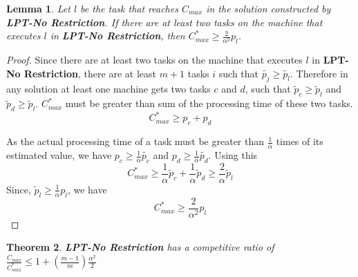 \documentclass[10pt, conference, compsocconf]{IEEEtran}
\newtheorem{theorem}{Theorem}
\newtheorem{lemma}[theorem]{Lemma}
\begin{document}
\begin{lemma}\label{No Restriction}
  Let $l$ be the task that reaches $C_{max}$ in the solution
  constructed by \textbf{LPT-No Restriction}. If there are at least two
  tasks on the machine that executes $l$ in \textbf{LPT-No Restriction}, then 
  $C_{max}^* \geq {\frac{2}{\alpha^{2}}} p_l$.
\end{lemma}
\begin{proof}
  Since there are at least two tasks on the machine that executes $l$
  in \textbf{LPT-No Restriction}, there are at least $m+1$ tasks $i$
  such that $\tilde{p_j} \geq \tilde{p_l}$. Therefore in any solution
  at least one machine gets two tasks $c$ and $d$, such that $\tilde
  p_c \geq \tilde p_l$ and $\tilde p_d \geq \tilde p_l$. $C_{max}^{*}$
  must be greater than sum of the processing time of these two tasks.
   \begin{equation}\nonumber
    C_{max}^{*}\geq p_c + p_d
  \end{equation}	

  As the actual processing time of a task must be greater than  $\frac{1}{\alpha}$ times of its estimated value, we have $p_c \geq \frac{1}{\alpha}\tilde{p_c}$ and $p_d \geq \frac{1}{\alpha}\tilde{p_d}$. Using this
  \begin{equation}\nonumber 
    C_{max}^{*} \geq \frac{1}{\alpha}\tilde p_c +  \frac{1}{\alpha} \tilde p_d \geq \frac{2}{\alpha}\tilde p_l
  \end{equation}
Since, $\tilde p_l \geq \frac{1}{\alpha} p_l$, we have
  \begin{equation}\nonumber
    C_{max}^{*} \geq {\frac{2}{\alpha^{2}}} p_l 
  \end{equation}
\end{proof}

\begin{theorem}
  \label{th:strategy2}
  \textbf{LPT-No Restriction} has a competitive ratio of
  $\frac{C_{max}}{C_{max}^{*}} \leq 1 + (\frac{m-1}{m})
  \frac{\alpha^{2}}{2}$
\end{theorem} 
\end{document}
